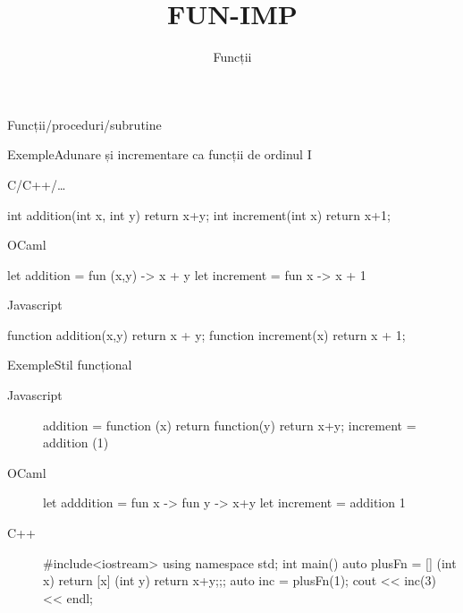 \documentclass[xcolor=pdftex,romanian,colorlinks]{beamer}
\title[SLP---Funcții]{FUN-IMP}
\subtitle{Funcții}
\begin{document}
\maketitle

\begin{section}{Funcții/proceduri/subrutine}

 \lstset{
               basicstyle=\small,
               tabsize=2,
               columns=flexible,
               mathescape=false,
	      upquote=true,
    }
\begin{frame}[fragile]{Exemple}{Adunare și incrementare ca funcții de ordinul I}
\begin{block}{C/C++/\ldots}
\begin{asciic}
int addition(int x, int y) { return x+y; }
int increment(int x) { return x+1; }
\end{asciic}
\end{block}

\begin{block}{OCaml}
\begin{asciiml}
let addition = fun (x,y) -> x + y
let increment = fun x -> x + 1
\end{asciiml}
\end{block}

\begin{block}{Javascript}
\begin{asciijs}
function addition(x,y) { return x + y; }
function increment(x) { return x + 1; }
\end{asciijs}
\end{block}

\end{frame}

\begin{frame}[fragile]{Exemple}{Stil funcțional}

\begin{description}
\item[Javascript]
\begin{asciijs}
addition = function (x) { return function(y) { return x+y; } }
increment = addition (1)
\end{asciijs}

\item[OCaml]
\begin{asciiml}
let adddition = fun x -> fun y -> x+y
let increment = addition 1
\end{asciiml}

\item[C++]
\begin{asciic}
#include<iostream>
using namespace std;
int main()
{
    auto plusFn = [] (int x) { return [x] (int y) {return x+y;};};
    auto inc = plusFn(1);
    cout << inc(3) << endl;
}
\end{asciic}
\end{description}
\end{frame}


\end{section}
\end{document}
